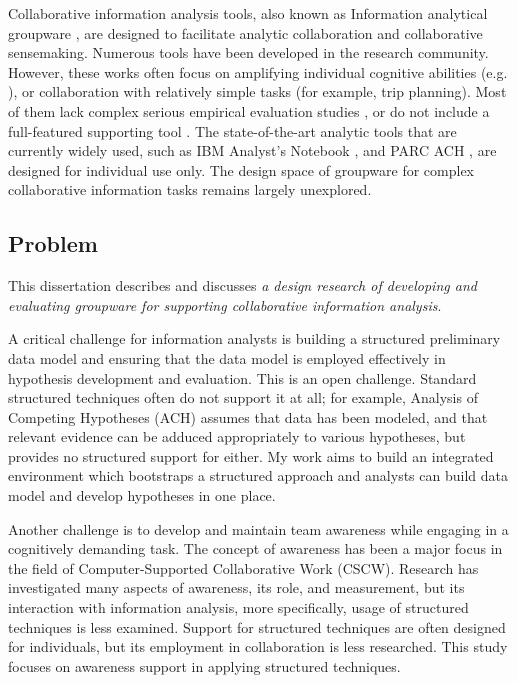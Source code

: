 Collaborative information analysis tools, also known as Information analytical groupware \citep{Grudin1994e}, are designed to facilitate analytic collaboration and collaborative sensemaking.
Numerous tools have been developed in the research community. However, these works often focus on amplifying individual cognitive abilities (e.g. \cite{Stasko2008, Bier2008}), or collaboration with relatively simple tasks (for example, trip planning). Most of them lack complex serious empirical evaluation studies \citep{Goyal2016,Convertino2011}, or do not include a full-featured supporting tool \citep{Carroll2013,Borge2012}. The state-of-the-art analytic tools that are currently widely used, such as IBM Analyst's Notebook \citep{IBM}, and PARC ACH \citep{PARC}, are designed for individual use only. The design space of groupware for complex collaborative information tasks remains largely unexplored.


\subsection{Problem}

This dissertation describes and discusses \textit{a design research of developing and evaluating groupware for supporting collaborative information analysis}. 

A critical challenge for information analysts is building a structured preliminary data model and ensuring that the data model is employed effectively in hypothesis development and evaluation. This is an open challenge. Standard structured techniques often do not support it at all; for example, Analysis of Competing Hypotheses (ACH) assumes that data has been modeled, and that relevant evidence can be adduced appropriately to various hypotheses, but provides no structured support for either. My work aims to build an integrated environment which bootstraps a structured approach and analysts can build data model and develop hypotheses in one place. 

Another challenge is to develop and maintain team awareness while engaging in a cognitively demanding task. The concept of awareness has been a major focus in the field of Computer-Supported Collaborative Work (CSCW). Research has investigated many aspects of awareness, its role, and measurement, but its interaction with information analysis, more specifically, usage of structured techniques is less examined. Support for structured techniques are often designed for individuals, but its employment in collaboration is less researched. This study focuses on awareness support in applying structured techniques.

